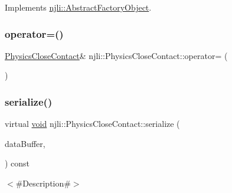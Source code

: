 Implements \mbox{\hyperlink{classnjli_1_1_abstract_factory_object_a838f4fa7e65cace6098aab5222892942}{njli\+::\+Abstract\+Factory\+Object}}.

\mbox{\label{classnjli_1_1_physics_close_contact_a731270363395fa1154af53a4b9252242}} 
\subsubsection{\texorpdfstring{operator=()}{operator=()}}
{\footnotesize\ttfamily \mbox{\hyperlink{classnjli_1_1_physics_close_contact}{Physics\+Close\+Contact}}\& njli\+::\+Physics\+Close\+Contact\+::operator= (\begin{DoxyParamCaption}\item[{const \mbox{\hyperlink{classnjli_1_1_physics_close_contact}{Physics\+Close\+Contact}} \&}]{ }\end{DoxyParamCaption})\hspace{0.3cm}{\ttfamily [protected]}}

\mbox{\label{classnjli_1_1_physics_close_contact_a555f478bcf7a1edbb7723f9391272552}} 
\subsubsection{\texorpdfstring{serialize()}{serialize()}}
{\footnotesize\ttfamily virtual \mbox{\hyperlink{_thread_8h_af1e856da2e658414cb2456cb6f7ebc66}{void}} njli\+::\+Physics\+Close\+Contact\+::serialize (\begin{DoxyParamCaption}\item[{\mbox{\hyperlink{_thread_8h_af1e856da2e658414cb2456cb6f7ebc66}{void}} $\ast$}]{data\+Buffer,  }\item[{bt\+Serializer $\ast$}]{ }\end{DoxyParamCaption}) const\hspace{0.3cm}{\ttfamily [virtual]}}



$<$\#\+Description\#$>$ 

